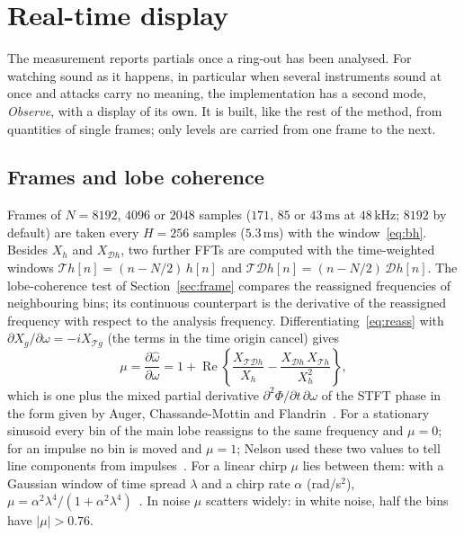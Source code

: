 \documentclass[10pt,a4paper,twocolumn]{article}
\newcommand{\ms}{\,\mathrm{ms}}
\begin{document}
\section{Real-time display}
\label{sec:observe}

The measurement reports partials once a ring-out has been analysed. For watching sound as it happens, in particular when several instruments sound at once and attacks carry no meaning, the implementation has a second mode, \emph{Observe}, with a display of its own. It is built, like the rest of the method, from quantities of single frames; only levels are carried from one frame to the next.

\subsection{Frames and lobe coherence}

Frames of $N = 8192$, $4096$ or $2048$ samples ($171$, $85$ or $43\ms$ at $48\,\mathrm{kHz}$; $8192$ by default) are taken every $H = 256$ samples ($5.3\ms$) with the window~\eqref{eq:bh}. Besides $X_h$ and $X_{\mathcal{D}h}$, two further FFTs are computed with the time-weighted windows $\mathcal{T}h[n] = (n - N/2)\,h[n]$ and $\mathcal{T}\mathcal{D}h[n] = (n - N/2)\,\mathcal{D}h[n]$. The lobe-coherence test of Section~\ref{sec:frame} compares the reassigned frequencies of neighbouring bins; its continuous counterpart is the derivative of the reassigned frequency with respect to the analysis frequency. Differentiating~\eqref{eq:reass} with $\partial X_g/\partial\omega = -i X_{\mathcal{T}g}$ (the terms in the time origin cancel) gives
\begin{equation}
\mu = \frac{\partial\hat\omega}{\partial\omega} = 1 + \operatorname{Re}\left\{ \frac{X_{\mathcal{T}\mathcal{D}h}}{X_h} - \frac{X_{\mathcal{D}h}\,X_{\mathcal{T}h}}{X_h^2} \right\},
\label{eq:mu}
\end{equation}
which is one plus the mixed partial derivative $\partial^2\Phi/\partial t\,\partial\omega$ of the STFT phase in the form given by Auger, Chassande-Mottin and Flandrin~\cite{AugerLM}. For a stationary sinusoid every bin of the main lobe reassigns to the same frequency and $\mu = 0$; for an impulse no bin is moved and $\mu = 1$; Nelson used these two values to tell line components from impulses~\cite{Nelson01,Nelson02,FitzFulop}. For a linear chirp $\mu$ lies between them: with a Gaussian window of time spread $\lambda$ and a chirp rate $\alpha$ (rad/s$^2$), $\mu = \alpha^2\lambda^4/(1+\alpha^2\lambda^4)$~\cite{AugerLM}. In noise $\mu$ scatters widely: in white noise, half the bins have $|\mu| > 0.76$.
\end{document}
